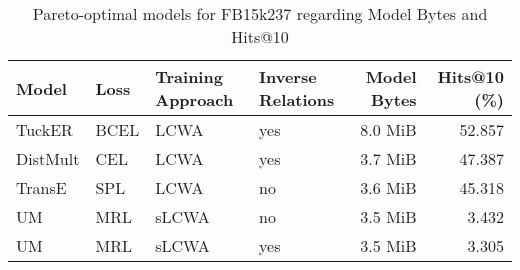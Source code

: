 \begin{table}[H]
\centering
\caption{Pareto-optimal models for FB15k237 regarding Model Bytes and Hits@10}
\label{tab:skyline_fb15k237_model_bytes}
\begin{tabular}{llllrr}
\toprule
   Model & Loss & Training Approach & Inverse Relations & Model Bytes &  Hits@10 (\%) \\
\midrule
  TuckER & BCEL &              LCWA &               yes &     8.0 MiB &       52.857 \\
DistMult &  CEL &              LCWA &               yes &     3.7 MiB &       47.387 \\
  TransE &  SPL &              LCWA &                no &     3.6 MiB &       45.318 \\
      UM &  MRL &             sLCWA &                no &     3.5 MiB &        3.432 \\
      UM &  MRL &             sLCWA &               yes &     3.5 MiB &        3.305 \\
\bottomrule
\end{tabular}
\end{table}

